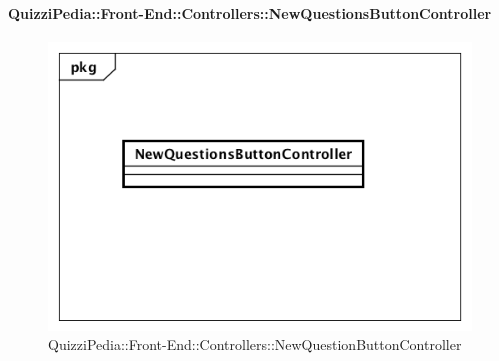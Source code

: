 \paragraph{QuizziPedia::Front-End::Controllers::NewQuestionsButtonController}
\begin{figure} [ht]
	\centering
	\includegraphics[scale=0.45]{UML/Classi/Front-End/QuizziPedia_Front-end_Controller_NewQuestionsButtonController.png}
	\caption{QuizziPedia::Front-End::Controllers::NewQuestionButtonController}
\end{figure} \FloatBarrier
